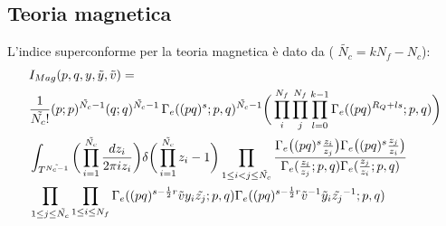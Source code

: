 \documentclass[a4paper,12pt]{report}
\begin{document}
\subsection{Teoria magnetica}
L'indice superconforme per la teoria magnetica è dato da ( $\tilde{N_c} = k N_f - N_c$):
\begin{align*}
&I_{Mag} ( p,q,y,\tilde y,\tilde v) = \\
 & { 1 \over \tilde{N_c !}} (p;p)^{\tilde{N_c}-1} ( q;q)^{\tilde{N_c}-1} \, \Gamma_e( (pq)^s;p,q)^{\tilde{N_c}-1} \bigg( \prod_i^{N_f} \prod_j^{N_f}  \prod_{l=0}^{k-1} \Gamma_e ( (pq)^{R_Q + l s} ; p ,q) \bigg) \\
&\int_{T^{\tilde{N_c-1}}} \bigg( \prod_{i=1}^{ \tilde{N_c }} { d z_i \over { 2 \pi i z_i} } \bigg) \delta \bigg( \prod_{i=1}^{\tilde{N_c}} z_i - 1 \bigg) 
\prod_{ 1 \leq i < j \leq \tilde{N_c}} \frac{ \Gamma_e \big( (pq)^s {z_i \over z_j} \big) \Gamma_e \big( (pq)^s {z_j \over z_i} \big) }{ \Gamma_e( {z_i \over z_j};p,q) \Gamma_e({z_j \over z_i}; p,q)} \\
& \prod_{ 1 \leq j \leq \tilde{N_c}} \prod_{ 1 \leq i \leq N_f} \Gamma_e ( (pq)^{s - {1 \over 2 } r} \tilde{v} y_i \tilde{z_j} ; p,q)\Gamma_e ( (pq)^{s - {1 \over 2 } r} \tilde{v}^{-1} \tilde y_i \tilde{z_j}^{-1} ; p,q)
\end{align*}


\end{document}

